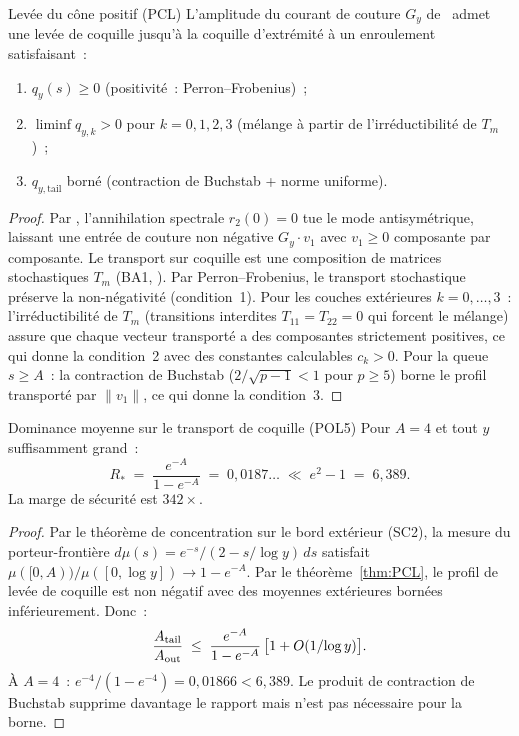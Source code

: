 \documentclass[12pt,a4paper]{article}
\begin{document}
\begin{thmbox}{Levée du cône positif (PCL)}
\label{thm:PCL}
L'amplitude du courant de couture $G_y$ de~\cite{companion_M3}
admet une levée de coquille jusqu'à la coquille d'extrémité à un
enroulement satisfaisant~:
\begin{enumerate}[nosep]
\item $q_y(s) \geq 0$ \textup{(positivité~: Perron--Frobenius)~;}
\item $\liminf q_{y,k} > 0$ pour $k = 0,1,2,3$
  \textup{(mélange à partir de l'irréductibilité de $T_m$)~;}
\item $q_{y,\text{tail}}$ borné \textup{(contraction de Buchstab
  + norme uniforme).}
\end{enumerate}
\begin{proof}
Par \cite{companion_M3}, l'annihilation spectrale $r_2(0) = 0$ tue
le mode antisymétrique, laissant une entrée de couture non
négative $G_y \cdot v_1$ avec $v_1 \geq 0$ composante par
composante. Le transport sur coquille est une composition de
matrices stochastiques $T_m$ (BA1, \cite{companion_M1}). Par
Perron--Frobenius, le transport stochastique préserve la
non-négativité (condition~1). Pour les couches extérieures
$k = 0,\ldots,3$~: l'irréductibilité de $T_m$ (transitions
interdites $T_{11} = T_{22} = 0$ qui forcent le mélange) assure
que chaque vecteur transporté a des composantes strictement
positives, ce qui donne la condition~2 avec des constantes
calculables $c_k > 0$. Pour la queue $s \geq A$~: la contraction
de Buchstab ($2/\!\sqrt{p-1} < 1$ pour $p\geq 5$) borne le profil
transporté par $\|v_1\|$, ce qui donne la condition~3.
\end{proof}
\end{thmbox}

\begin{thmbox}{Dominance moyenne sur le transport de coquille (POL5)}
\label{thm:POL5}
Pour $A = 4$ et tout $y$ suffisamment grand~:
\begin{equation}
  R_* \;=\; \frac{e^{-A}}{1 - e^{-A}}
  \;=\; 0{,}0187\ldots
  \;\ll\; e^2 - 1 \;=\; 6{,}389.
  \label{eq:POL5_ratio}
\end{equation}
La marge de sécurité est $342\times$.
\begin{proof}
Par le théorème de concentration sur le bord extérieur (SC2), la
mesure du porteur-frontière $d\mu(s) = e^{-s}/(2 - s/\!\log y)\,ds$
satisfait $\mu([0,A))/\mu([0,\log y]) \to 1 - e^{-A}$. Par le
théorème~\ref{thm:PCL}, le profil de levée de coquille est non
négatif avec des moyennes extérieures bornées inférieurement.
Donc~:
\[
  \frac{A_{\rm tail}}{A_{\rm out}}
  \;\leq\;
  \frac{e^{-A}}{1 - e^{-A}}\,\bigl[1 + O(1/\!\log y)\bigr].
\]
À $A = 4$~: $e^{-4}/(1 - e^{-4}) = 0{,}01866 < 6{,}389$. Le
produit de contraction de Buchstab supprime davantage le rapport
mais n'est pas nécessaire pour la borne.
\end{proof}
\end{thmbox}
\end{document}
